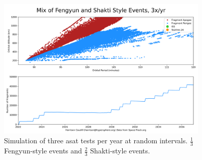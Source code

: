 \begin{figure}[ht!]
  \begin{center}
    \includegraphics[width=4in]{doom.png}
  \end{center}
  \caption{Simulation of three \ac{asat} tests per year at random
    intervals.  $\frac{1}{3}$ Fengyun-style events and $\frac{2}{3}$
    Shakti-style events.}
  \label{figure::gabby::doomsday::doom}
\end{figure}
